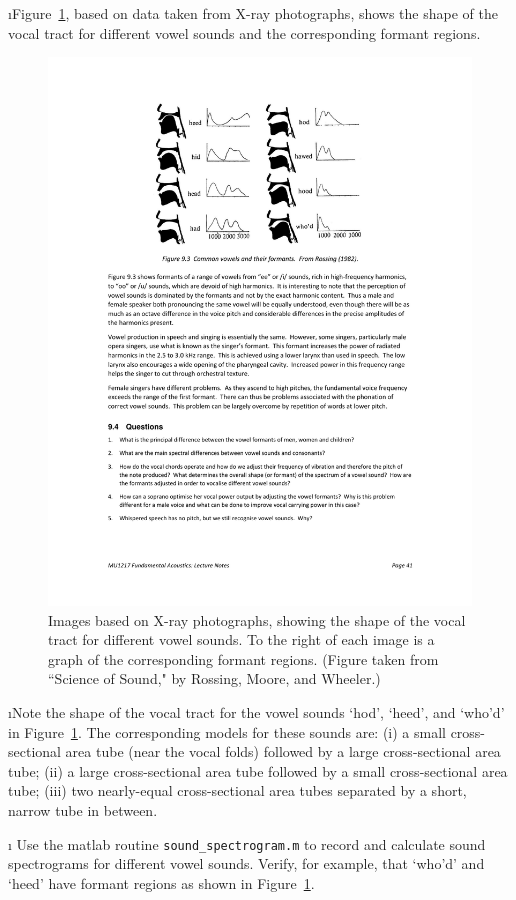 \i Figure~\ref{f:xrays_vocaltract}, based on data
taken from X-ray photographs, shows the shape of the
vocal tract for different vowel sounds and the 
corresponding formant regions.
%
\begin{figure}[htbp]
\begin{center}
\includegraphics[width=.8\textwidth]{xrays_vocaltract}
\caption{Images based on X-ray photographs, showing the
shape of the vocal tract for different vowel sounds.
To the right of each image is a graph of the corresponding
formant regions.
(Figure taken from 
``Science of Sound," by Rossing, Moore, and Wheeler.)}
\label{f:xrays_vocaltract}
\end{center}
\end{figure}
%

\i Note the shape of the vocal tract for the 
vowel sounds `hod', `heed', and `who'd'
in Figure~\ref{f:xrays_vocaltract}.
The corresponding models for these sounds are:
(i) a small cross-sectional area tube (near the vocal folds) 
followed by a large  cross-sectional area tube;
(ii) a large cross-sectional area tube 
followed by a small cross-sectional area tube;
(iii) two nearly-equal cross-sectional area tubes separated 
by a short, narrow tube in between.

\i \demo
Use the matlab routine {\tt sound\_spectrogram.m} to 
record and calculate sound spectrograms for different
vowel sounds.
Verify, for example, that `who'd' and `heed' have 
formant regions as shown in Figure~\ref{f:xrays_vocaltract}.


